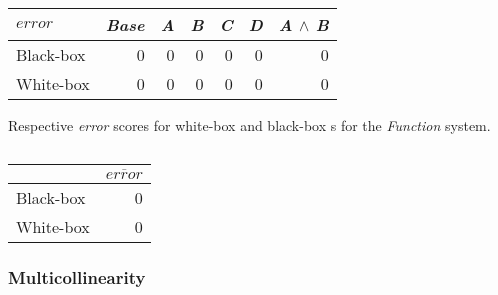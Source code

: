 \begin{table}[H]
    \begin{minipage}{.5\linewidth}
        \centering
        \begin{tabular}{lrrrrrr}    \toprule
        $error$     & \emph{Base} & \emph{A} & \emph{B} & \emph{C} & \emph{D} & \emph{A} $\land$ \emph{B}   \\ \midrule
        Black-box & 0 & 0 & 0 & 0 & 0 & 0      \\
        White-box & 0 & 0 & 0 & 0 & 0 & 0      \\ \bottomrule
        \end{tabular}
        \caption{Respective \emph{error} scores for white-box and black-box {\perfInfluenceModel}s for the \emph{Function} system.}
    \end{minipage}%
    \hspace{7mm}
    \begin{minipage}{.3\linewidth}
        \centering
        \begin{tabular}{lr}
            \toprule
                      & $\overline{error}$   \\ \midrule
            Black-box & 0              \\
            White-box & 0              \\ \bottomrule
            \end{tabular}
            \caption{}
        \end{minipage}
    \end{table}
    
    \subsubsection*{Multicollinearity}


